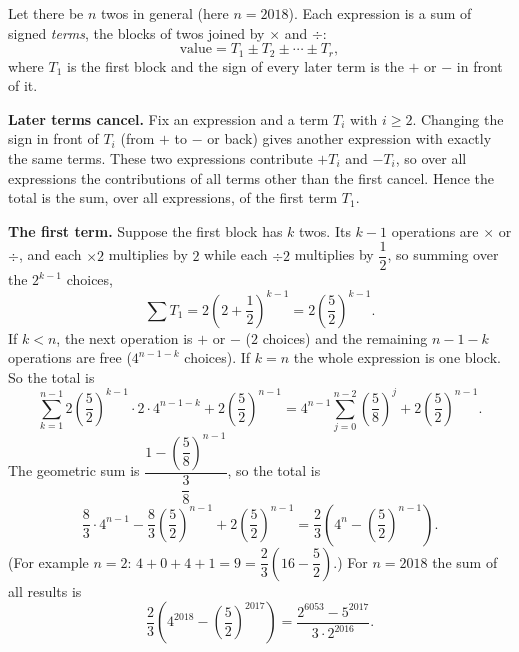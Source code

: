Let there be $n$ twos in general (here $n=2018$). Each expression is a sum of signed \emph{terms}, the blocks of twos joined by $\times$ and $\div$:
\[
\text{value}=T_1\pm T_2\pm\cdots\pm T_r ,
\]
where $T_1$ is the first block and the sign of every later term is the $+$ or $-$ in front of it.

\textbf{Later terms cancel.} Fix an expression and a term $T_i$ with $i\ge2$. Changing the sign in front of $T_i$ (from $+$ to $-$ or back) gives another expression with exactly the same terms. These two expressions contribute $+T_i$ and $-T_i$, so over all expressions the contributions of all terms other than the first cancel. Hence the total is the sum, over all expressions, of the first term $T_1$.

\textbf{The first term.} Suppose the first block has $k$ twos. Its $k-1$ operations are $\times$ or $\div$, and each $\times2$ multiplies by $2$ while each $\div2$ multiplies by $\dfrac{1}{2}$, so summing over the $2^{k-1}$ choices,
\[
\sum T_1=2\left(2+\dfrac{1}{2}\right)^{k-1}=2\left(\dfrac{5}{2}\right)^{k-1}.
\]
If $k<n$, the next operation is $+$ or $-$ ($2$ choices) and the remaining $n-1-k$ operations are free ($4^{n-1-k}$ choices). If $k=n$ the whole expression is one block. So the total is
\[
\sum_{k=1}^{n-1}2\left(\dfrac{5}{2}\right)^{k-1}\cdot2\cdot4^{n-1-k}+2\left(\dfrac{5}{2}\right)^{n-1}
=4^{n-1}\sum_{j=0}^{n-2}\left(\dfrac{5}{8}\right)^{j}+2\left(\dfrac{5}{2}\right)^{n-1}.
\]
The geometric sum is $\dfrac{1-\left(\dfrac{5}{8}\right)^{n-1}}{\dfrac{3}{8}}$, so the total is
\[
\dfrac{8}{3}\cdot4^{n-1}-\dfrac{8}{3}\left(\dfrac{5}{2}\right)^{n-1}+2\left(\dfrac{5}{2}\right)^{n-1}=\dfrac{2}{3}\left(4^{n}-\left(\dfrac{5}{2}\right)^{n-1}\right).
\]
(For example $n=2$: $4+0+4+1=9=\dfrac{2}{3}\left(16-\dfrac{5}{2}\right)$.) For $n=2018$ the sum of all results is
\[
\boxed{\dfrac{2}{3}\left(4^{2018}-\left(\dfrac{5}{2}\right)^{2017}\right)=\dfrac{2^{6053}-5^{2017}}{3\cdot2^{2016}}}.
\]
